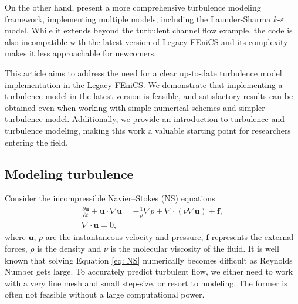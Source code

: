 On the other hand, \cite{mortensen_fenics-based_2011} present a more comprehensive turbulence modeling framework, implementing multiple models, including the Launder-Sharma \(k\)-\(\varepsilon\) model. While it extends beyond the turbulent channel flow example, the code is also incompatible with the latest version of Legacy FEniCS and its complexity makes it less approachable for newcomers.

This article aims to address the need for a clear up-to-date turbulence model implementation in the Legacy FEniCS. We demonstrate that implementing a turbulence model in the latest version is feasible, and satisfactory results can be obtained even when working with simple numerical schemes and simpler turbulence model. Additionally, we provide an introduction to turbulence and turbulence modeling, making this work a valuable starting point for researchers entering the field. 

\subsection{Modeling turbulence}

Consider the incompressible Navier--Stokes (NS) equations
\begin{equation}\label{eq: NS}
    \begin{split}
        \frac{\partial \mathbf{u}}{\partial t} + \mathbf{u} \cdot \nabla{\mathbf{u}}
        = 
        - \frac{1}{\rho} \nabla p + \nabla \cdot (\nu \nabla \mathbf{u}) + \mathbf{f},
        \\
        \nabla \cdot \mathbf{u}
        = 0,
    \end{split}
\end{equation}
where \(\mathbf{u}\), \(p\) are the instantaneous velocity and pressure, \(\mathbf{f}\) represents the external forces, \(\rho\) is the density and \(\nu\) is the molecular viscosity of the fluid. It is well known that solving Equation \eqref{eq: NS} numerically becomes difficult as Reynolds Number gets large. To accurately predict turbulent flow, we either need to work with a very fine mesh and small step-size, or resort to modeling. The former is often not feasible without a large computational power.

